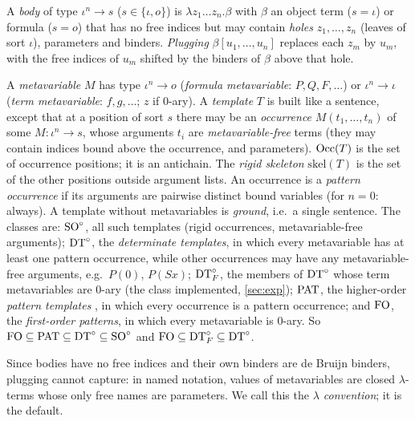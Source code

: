 \begin{definition}\label{def:setting:template}
A \emph{body} of type $\iota^n\to s$ ($s\in\{\iota,o\}$) is $\lambda z_1\dots z_n.\beta$ with $\beta$ an object term ($s=\iota$) or formula ($s=o$) that has no free indices but may contain \emph{holes} $z_1,\dots,z_n$ (leaves of sort $\iota$), parameters and binders. \emph{Plugging} $\beta[u_1,\dots,u_n]$ replaces each $z_m$ by $u_m$, with the free indices of $u_m$ shifted by the binders of $\beta$ above that hole.

A \emph{metavariable} $M$ has type $\iota^n\to o$ (\emph{formula metavariable}: $P,Q,F,\dots$) or $\iota^n\to\iota$ (\emph{term metavariable}: $f,g,\dots$; $z$ if $0$-ary). A \emph{template} $T$ is built like a sentence, except that at a position of sort $s$ there may be an \emph{occurrence} $M(t_1,\dots,t_n)$ of some $M:\iota^n\to s$, whose arguments $t_i$ are \emph{metavariable-free} terms (they may contain indices bound above the occurrence, and parameters). $\mathrm{Occ}(T)$ is the set of occurrence positions; it is an antichain. The \emph{rigid skeleton} $\mathrm{skel}(T)$ is the set of the other positions outside argument lists. An occurrence is a \emph{pattern occurrence} if its arguments are pairwise distinct bound variables (for $n=0$: always). A template without metavariables is \emph{ground}, i.e.\ a single sentence. The classes are: $\mathrm{SO}^{\circ}$, all such templates (rigid occurrences, metavariable-free arguments); $\mathrm{DT}^{\circ}$, the \emph{determinate templates}, in which every metavariable has at least one pattern occurrence, while other occurrences may have any metavariable-free arguments, e.g.\ $P(0)$, $P(Sx)$; $\mathrm{DT}^{\circ}_{F}$, the members of $\mathrm{DT}^{\circ}$ whose term metavariables are $0$-ary (the class implemented, \cref{sec:exp}); $\mathrm{PAT}$, the higher-order \emph{pattern templates} \citep{miller1991logic}, in which every occurrence is a pattern occurrence; and $\mathrm{FO}$, the \emph{first-order patterns}, in which every metavariable is $0$-ary. So $\mathrm{FO}\subseteq\mathrm{PAT}\subseteq\mathrm{DT}^{\circ}\subseteq\mathrm{SO}^{\circ}$ and $\mathrm{FO}\subseteq\mathrm{DT}^{\circ}_{F}\subseteq\mathrm{DT}^{\circ}$.
\end{definition}

Since bodies have no free indices and their own binders are de Bruijn binders, plugging cannot capture: in named notation, values of metavariables are closed $\lambda$-terms whose only free names are parameters. We call this the \emph{$\lambda$ convention}; it is the default.


